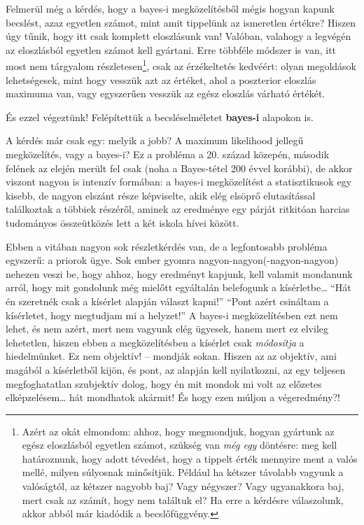 \documentclass[magyar,]{book}
\let\rmarkdownfootnote\footnote%
\def\footnote{\protect\rmarkdownfootnote}
\begin{document}
Felmerül még a kérdés, hogy a bayes-i megközelítésből mégis hogyan kapunk becslést, azaz egyetlen számot, mint amit tippelünk az ismeretlen értékre? Hiszen úgy tűnik, hogy itt csak komplett eloszlásunk van! Valóban, valahogy a legvégén az eloszlásból egyetlen számot kell gyártani. Erre többféle módszer is van, itt most nem tárgyalom részletesen\footnote{Azért az okát elmondom: ahhoz, hogy megmondjuk, hogyan gyártunk az egész eloszlásból egyetlen számot, szükség van \emph{még egy} döntésre: meg kell határoznunk, hogy adott tévedést, hogy a tippelt érték mennyire ment a valós mellé, milyen súlyosnak minősítjük. Például ha kétszer távolabb vagyunk a valóságtól, az kétszer nagyobb baj? Vagy négyszer? Vagy ugyanakkora baj, mert csak az számít, hogy nem találtuk el? Ha erre a kérdésre válaszolunk, akkor abból már kiadódik a becslőfüggvény.}, csak az érzékeltetés kedvéért: olyan megoldások lehetségesek, mint hogy vesszük azt az értéket, ahol a poszterior eloszlás maximuma van, vagy egyszerűen vesszük az egész eloszlás várható értékét.

És ezzel végeztünk! Felépítettük a becsléselméletet \textbf{bayes-i} alapokon is.

A kérdés már csak egy: melyik a jobb? A maximum likelihood jellegű megközelítés, vagy a bayes-i? Ez a probléma a 20. század közepén, második felének az elején merült fel csak (noha a Bayes-tétel 200 évvel korábbi), de akkor viszont nagyon is intenzív formában: a bayes-i megközelítést a statisztikusok egy kisebb, de nagyon elszánt része képviselte, akik elég elsöprő elutasítással találkoztak a többiek részéről, aminek az eredménye egy párját ritkitóan harcias tudományos összeütközés lett a két iskola hívei között.

Ebben a vitában nagyon sok részletkérdés van, de a legfontosabb probléma egyszerű: a priorok ügye. Sok ember gyomra nagyon-nagyon(-nagyon-nagyon) nehezen veszi be, hogy ahhoz, hogy eredményt kapjunk, kell valamit mondanunk arról, hogy mit gondolunk még mielőtt egyáltalán belefogunk a kísérletbe\ldots{} \enquote{Hát én szeretnék csak a kísérlet alapján választ kapni!} \enquote{Pont azért csináltam a kísérletet, hogy megtudjam mi a helyzet!} A bayes-i megközelítésben ezt nem lehet, és nem azért, mert nem vagyunk elég ügyesek, hanem mert ez elvileg lehetetlen, hiszen ebben a megközelítésben a kísérlet csak \emph{módosítja} a hiedelmünket. Ez nem objektív! -- mondják sokan. Hiszen az az objektív, ami magából a kísérletből kijön, és pont, az alapján kell nyilatkozni, az egy teljesen megfoghatatlan szubjektív dolog, hogy én mit mondok mi volt az előzetes elképzelésem\ldots{} hát mondhatok akármit! És hogy ezen múljon a végeredmény?!
\end{document}
